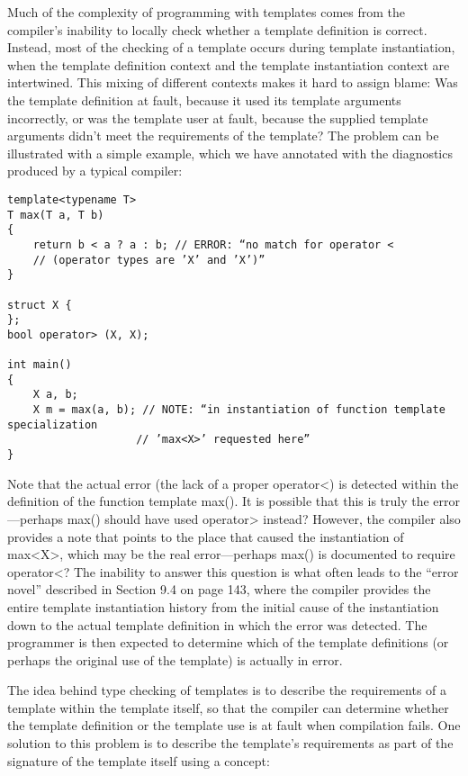 
Much of the complexity of programming with templates comes from the compiler’s inability to locally check whether a template definition is correct. Instead, most of the checking of a template occurs during template instantiation, when the template definition context and the template instantiation context are intertwined. This mixing of different contexts makes it hard to assign blame: Was the template definition at fault, because it used its template arguments incorrectly, or was the template user at fault, because the supplied template arguments didn’t meet the requirements of the template? The problem can be illustrated with a simple example, which we have annotated with the diagnostics produced by a typical compiler:

\begin{lstlisting}[style=styleCXX]
template<typename T>
T max(T a, T b)
{
	return b < a ? a : b; // ERROR: “no match for operator <
	// (operator types are ’X’ and ’X’)”
}

struct X {
};
bool operator> (X, X);

int main()
{
	X a, b;
	X m = max(a, b); // NOTE: “in instantiation of function template specialization
					// ’max<X>’ requested here”
}
\end{lstlisting}

Note that the actual error (the lack of a proper operator<) is detected within the definition of the function template max(). It is possible that this is truly the error—perhaps max() should have used operator> instead? However, the compiler also provides a note that points to the place that caused the instantiation of max<X>, which may be the real error—perhaps max() is documented to require operator<? The inability to answer this question is what often leads to the “error novel” described in Section 9.4 on page 143, where the compiler provides the entire template instantiation history from the initial cause of the instantiation down to the actual template definition in which the error was detected. The programmer is then expected to determine which of the template definitions (or perhaps the original use of the template) is actually in error.

The idea behind type checking of templates is to describe the requirements of a template within the template itself, so that the compiler can determine whether the template definition or the template use is at fault when compilation fails. One solution to this problem is to describe the template’s requirements as part of the signature of the template itself using a concept:

